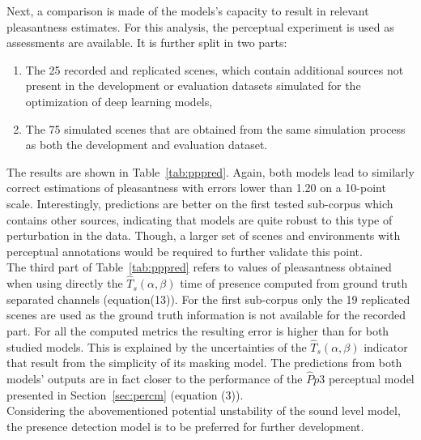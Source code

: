 \documentclass[11pt,a4paper]{article}
\begin{document}
Next, a comparison is made of the models's capacity to result in relevant pleasantness estimates. For this analysis, the perceptual experiment is used as assessments are available. It is further split in two parts:
\begin{enumerate}
\item The 25 recorded and replicated scenes, which contain additional sources not present in the development or evaluation datasets simulated for the optimization of deep learning models,
\item The 75 simulated scenes that are obtained from the same simulation process as both the development and evaluation dataset.
\end{enumerate}
The results are shown in Table~\ref{tab:pppred}. Again, both models lead to similarly correct estimations of pleasantness with errors lower than 1.20 on a 10-point scale. Interestingly, predictions are better on the first tested sub-corpus which contains other sources, indicating that models are quite robust to this type of perturbation in the data. Though, a larger set of scenes and environments with perceptual annotations would be required to further validate this point.\\

The third part of Table~\ref{tab:pppred} refers to values of pleasantness obtained when using directly the $\hat T_s(\alpha, \beta)$ time of presence computed from ground truth separated channels (equation(13)). For the first sub-corpus only the 19 replicated scenes are used as the ground truth information is not available for the recorded part. For all the computed metrics the resulting error is higher than for both studied models. This is explained by the uncertainties of the $\hat T_s(\alpha, \beta)$ indicator that result from the simplicity of its masking model. The predictions from both models' outputs are in fact closer to the performance of the $\hat Pp3$ perceptual model presented in Section~\ref{sec:percm} (equation (3)).\\

Considering the abovementioned potential unstability of the sound level model, the presence detection model is to be preferred for further development.
\end{document}
